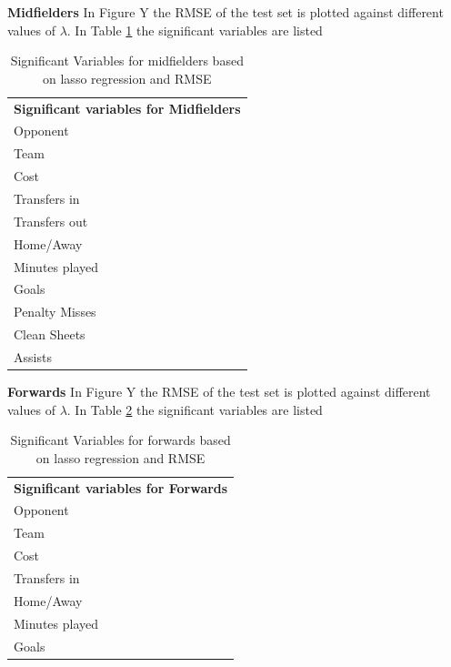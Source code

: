 \textbf{Midfielders}
In Figure Y the RMSE of the test set is plotted against different values of $\lambda$. In Table \ref{tab:sig_var_MID} the significant variables are listed

\begin{table}[H]
\centering
\caption{Significant Variables for midfielders based on lasso regression and RMSE}
\label{tab:sig_var_MID}
\begin{tabular}{l}
\textbf{Significant variables for Midfielders }\\
Opponent                              \\
Team                                  \\
Cost                                  \\
Transfers in                          \\
Transfers out                         \\
Home/Away                             \\
Minutes played                        \\
Goals
        \\
Penalty Misses
        \\
Clean Sheets
        \\
Assists
\end{tabular}
\end{table}

\textbf{Forwards}
In Figure Y the RMSE of the test set is plotted against different values of $\lambda$. In Table \ref{tab:sig_var_FWD} the significant variables are listed

\begin{table}[H]
\centering
\caption{Significant Variables for forwards based on lasso regression and RMSE}
\label{tab:sig_var_FWD}
\begin{tabular}{l}
\textbf{Significant variables for Forwards}\\
Opponent                              \\
Team                                  \\
Cost                                  \\
Transfers in                          \\
Home/Away                             \\
Minutes played                        \\
Goals

\end{tabular}
\end{table}


